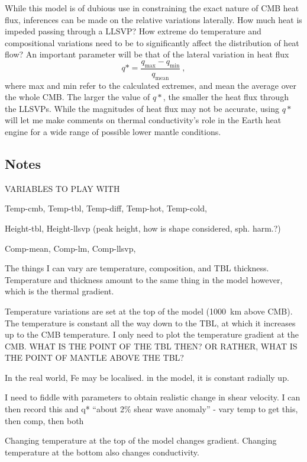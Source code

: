 While this model is of dubious use in constraining the exact nature of CMB heat flux, inferences can be made on the relative variations laterally. How much heat is impeded passing through a LLSVP? How extreme do temperature and compositional variations need to be to significantly affect the distribution of heat flow? An important parameter will be that of the lateral variation in heat flux
%
\begin{equation}
\label{eq.q_star}
q* = \frac{q_{\mathrm{max}}-q_{\mathrm{min}}}{q_{\mathrm{mean}}}\ ,
\end{equation}
%
where max and min refer to the calculated extremes, and mean the average over the whole CMB. The larger the value of $q*$, the smaller the heat flux through the LLSVPs. While the magnitudes of heat flux may not be accurate, using $q*$ will let me make comments on thermal conductivity's role in the Earth heat engine for a wide range of possible lower mantle conditions.

\subsection{Notes}

VARIABLES TO PLAY WITH

Temp-cmb,
Temp-tbl,
Temp-diff,
Temp-hot,
Temp-cold,

Height-tbl,
Height-llsvp (peak height, how is shape considered, sph. harm.?)

Comp-mean,
Comp-lm,
Comp-llsvp,


The things I can vary are temperature, composition, and TBL thickness. Temperature and thickness amount to the same thing in the model however, which is the thermal gradient.

Temperature variations are set at the top of the model (1000~km above CMB). The temperature is constant all the way down to the TBL, at which it increases up to the CMB temperature. I only need to plot the temperature gradient at the CMB. WHAT IS THE POINT OF THE TBL THEN? OR RATHER, WHAT IS THE POINT OF MANTLE ABOVE THE TBL?

In the real world, Fe may be localised. in the model, it is constant radially up. 

I need to fiddle with parameters to obtain realistic change in shear velocity. I can then record this and q* ``about 2\% shear wave anomaly'' - vary temp to get this, then comp, then both

Changing temperature at the top of the model changes gradient. Changing temperature at the bottom also changes conductivity.

